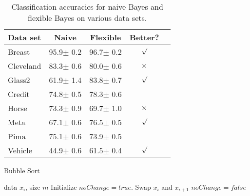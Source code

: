 \begin{table}[t]
    \caption{Classification accuracies for naive Bayes and flexible
    Bayes on various data sets.}
    \label{sample-table}
    \vskip 0.15in
    \begin{center}
        \begin{small}
            \begin{sc}
            \begin{tabular}{lcccr}
                \toprule
                Data set & Naive & Flexible & Better? \\
                \midrule
                Breast    & 95.9$\pm$ 0.2& 96.7$\pm$ 0.2& $\surd$ \\
                Cleveland & 83.3$\pm$ 0.6& 80.0$\pm$ 0.6& $\times$\\
                Glass2    & 61.9$\pm$ 1.4& 83.8$\pm$ 0.7& $\surd$ \\
                Credit    & 74.8$\pm$ 0.5& 78.3$\pm$ 0.6&         \\
                Horse     & 73.3$\pm$ 0.9& 69.7$\pm$ 1.0& $\times$\\
                Meta      & 67.1$\pm$ 0.6& 76.5$\pm$ 0.5& $\surd$ \\
                Pima      & 75.1$\pm$ 0.6& 73.9$\pm$ 0.5&         \\
                Vehicle   & 44.9$\pm$ 0.6& 61.5$\pm$ 0.4& $\surd$ \\
                \bottomrule
            \end{tabular}
            \end{sc}
        \end{small}
    \end{center}
    \vskip -0.1in
\end{table}

\begin{algorithm}[tb]
    \caption{Bubble Sort}
    \label{alg:example}
    \begin{algorithmic}
        data $x_i$, size $m$
       \REPEAT
       \STATE Initialize $noChange = true$.
       \STATE Swap $x_i$ and $x_{i+1}$
       \STATE $noChange = false$
       \ENDIF
       \ENDFOR
    \end{algorithmic}
\end{algorithm}



